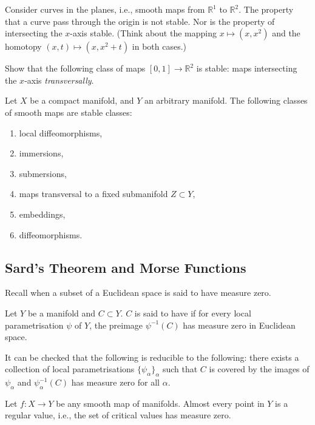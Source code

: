 \begin{ex}
	Consider curves in the planes, i.e., smooth maps from $\mathbb{R}^{1}$ to $\mathbb{R}^{2}$. The property that a curve pass through the origin is not stable. Nor is the property of intersecting the $x$-axis stable. (Think about the mapping $x \mapsto (x, x^{2})$ and the homotopy $(x, t) \mapsto (x, x^{2} + t)$ in both cases.)
\end{ex}

\begin{exe}
	Show that the following class of maps $[0, 1] \to \mathbb{R}^{2}$ is stable: maps intersecting the $x$-axis \emph{transversally}.
\end{exe}

\begin{thm} \label{thm:stability}
	Let $X$ be a compact manifold, and $Y$ an arbitrary manifold. The following classes of smooth maps are stable classes:
	\begin{enumerate}
		\item local diffeomorphisms,
		\item immersions,
		\item submersions,
		\item maps transversal to a fixed submanifold $Z \subset Y$,
		\item embeddings,
		\item diffeomorphisms.
	\end{enumerate}
\end{thm}

\subsection{Sard's Theorem and Morse Functions}

Recall when a subset of a Euclidean space is said to have measure zero.

\begin{defn}
	Let $Y$ be a manifold and $C \subset Y$. $C$ is said to have  if for every local parametrisation $\psi$ of $Y$, the preimage $\psi^{-1}(C)$ has measure zero in Euclidean space.
\end{defn}

It can be checked that the following is reducible to the following: there exists a collection of local parametrisations $\{\psi_{\alpha}\}_{\alpha}$ such that $C$ is covered by the images of $\psi_{\alpha}$ and $\psi_{\alpha}^{-1}(C)$ has measure zero for all $\alpha$.

\begin{thm}
	Let $f : X \to Y$ be any smooth map of manifolds. \newline
	Almost every point in $Y$ is a regular value, i.e., the set of critical values has measure zero.
\end{thm}

